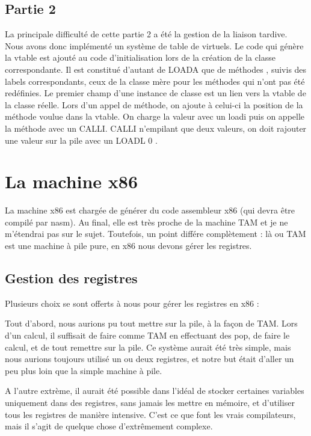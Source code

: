 \documentclass{scrartcl}
\begin{document}
\subsection{Partie 2}

La principale difficulté de cette partie 2 a été la gestion de la liaison tardive.
Nous avons donc implémenté un système de table de virtuels.
Le code qui génère la vtable est ajouté au code d'initialisation lors de la création de la classe correspondante.
Il est constitué d'autant de LOADA que de méthodes , suivis des labels correspondants, ceux de la classe mère pour 
les méthodes qui n'ont pas été redéfinies. Le premier champ d'une instance de classe est un lien vers la vtable de la classe réelle.
Lors d'un appel de méthode, on ajoute à celui-ci la position de la méthode voulue dans la vtable.
On charge la valeur avec un loadi puis on appelle la méthode avec un CALLI.
CALLI n'empilant que deux valeurs, on doit rajouter une valeur sur la pile avec un LOADL 0 .



\section{La machine x86}

La machine x86 est chargée de générer du code assembleur x86 (qui devra être compilé par nasm).
Au final, elle est très proche de la machine TAM et je ne m'étendrai pas sur le sujet.
Toutefois, un point différe complètement : là ou TAM est une machine à pile pure, en x86 nous
devons gérer les registres.

\subsection{Gestion des registres}

Plusieurs choix se sont offerts à nous pour gérer les registres en x86 :

Tout d'abord, nous aurions pu tout mettre sur la pile, à la façon de TAM. Lors d'un calcul,
il suffisait de faire comme TAM en effectuant des pop, de faire le calcul, et de tout remettre
sur la pile. Ce système aurait été très simple, mais nous aurions toujours utilisé un ou deux
registres, et notre but était d'aller un peu plus loin que la simple machine à pile.

A l'autre extrème, il aurait été possible dans l'idéal de stocker certaines variables
uniquement dans des registres, sans jamais les mettre en mémoire, et d'utiliser tous les
registres de manière intensive. C'est ce que font les vrais compilateurs, mais il s'agit
de quelque chose d'extrêmement complexe.
\end{document}
